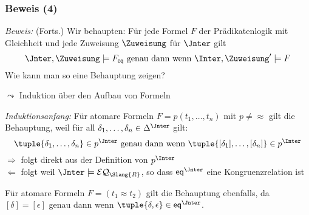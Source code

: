 \documentclass[aspectratio=1610,onlymath]{beamer}
\begin{document}
\begin{frame}[t]\frametitle{Beweis (4)}

% 

\emph{Beweis:} {\footnotesize(Forts.)}
Wir behaupten: Für jede Formel $F$ der Prädikatenlogik mit Gleichheit und jede Zuweisung $\Zuweisung$ für $\Jnter$ gilt
\[ \Jnter,\Zuweisung\models F_{\eqpred} \text{ genau dann wenn } \Inter,\Zuweisung'\models F \]
Wie kann man so eine Behauptung zeigen?\bigskip\pause

$\leadsto$ \alert{Induktion über den Aufbau von Formeln}\bigskip

\emph{Induktionsanfang:} Für atomare Formeln $F=p(t_1,\ldots,t_n)$ mit $p\neq{\approx}$ gilt die Behauptung,
weil für all $\delta_1,\ldots,\delta_n\in\Delta^\Jnter$ gilt:
\[ \tuple{\delta_1,\ldots,\delta_n}\in p^\Jnter \text{ genau dann wenn } \tuple{[\delta_1],\ldots,[\delta_n]}\in p^\Inter \]
$\Rightarrow$ folgt direkt aus der Definition von $p^\Inter$\\
$\Leftarrow$ folgt weil $\Jnter\models\mathcal{EQ}_{\Slang{R}}$, so dass $\eqpred^\Jnter$ eine Kongruenzrelation ist
\bigskip\pause

Für atomare Formeln $F=(t_1\approx t_2)$ gilt die Behauptung ebenfalls, da $[\delta]=[\epsilon]$ genau dann wenn $\tuple{\delta,\epsilon}\in\eqpred^\Jnter$.
\end{frame}
\end{document}
